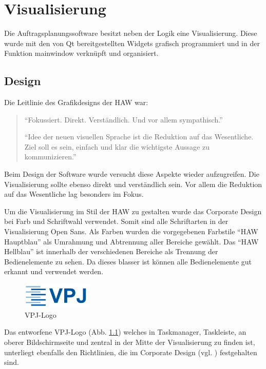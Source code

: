 
\chapter{Visualisierung}
\label{sec:Visualisierung}

Die Auftragsplanungssoftware besitzt neben der Logik eine Visualisierung. Diese wurde mit den von Qt bereitgestellten Widgets grafisch programmiert und in der Funktion mainwindow verknüpft und organisiert. 

\section{Design}

Die Leitlinie des Grafikdesigns der HAW war:

\begin{quote}
"`Fokussiert. Direkt. Verständlich.
Und vor allem sympathisch."'	

"`Idee der neuen visuellen Sprache ist die Reduktion auf das
Wesentliche. Ziel soll es sein, einfach und klar die wichtigste
Aussage zu kommunizieren."'
\cite[4]{corporate}
\end{quote}

Beim Design der Software wurde versucht diese Aspekte wieder aufzugreifen. Die Visualisierung sollte ebenso direkt und verständlich sein. Vor allem die Reduktion auf das Wesentliche lag besonders im Fokus. 

Um die Visualisierung im Stil der HAW zu gestalten wurde das Corporate Design bei Farb und Schriftwahl verwendet. Somit sind alle Schriftarten in der Visualisierung Open Sans. Als Farben wurden die vorgegebenen Farbstile "`HAW Hauptblau"' als Umrahmung und Abtrennung aller Bereiche gewählt. Das "`HAW Hellblau"' ist innerhalb der verschiedenen Bereiche als Trennung der Bedienelemente zu sehen. Da dieses blasser ist können alle Bedienelemente gut erkannt und verwendet werden. 

\begin{figure}[htb]
    \centering
    \includegraphics[width=0.3\textwidth]{Abbildungen/VPJ.png}
    \caption{VPJ-Logo}		
    \label{fig:VPJLogo}
\end{figure}

Das entworfene VPJ-Logo (Abb. \ref{fig:VPJLogo}) welches in Taskmanager, Taskleiste, an oberer Bildschirmseite und zentral in der Mitte der Visualisierung zu finden ist, unterliegt ebenfalls den Richtlinien, die im Corporate Design (vgl. \cite{corporate}) festgehalten sind. 


